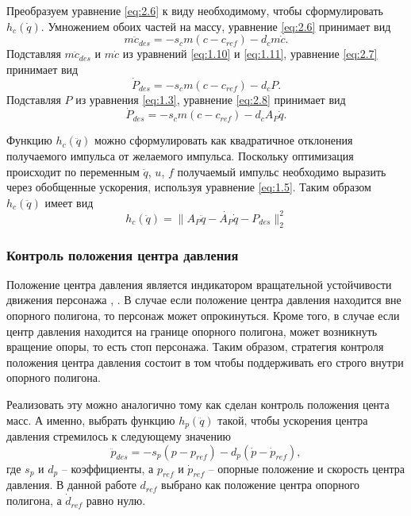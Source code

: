 Преобразуем уравнение \ref{eq:2.6} к виду необходимому, чтобы сформулировать $h_c(\dot{q})$. Умножением обоих частей на массу, уравнение \ref{eq:2.6} принимает вид
\begin{equation*}
  m \ddot{c}_{des} = - s_{c} m (c - c_{ref}) - d_{c} m \dot{c}. \tag{2.7}\label{eq:2.7}
\end{equation*}
Подставляя $m \ddot{c}_{des}$ и $m \dot{c}$ из уравнений \ref{eq:1.10} и \ref{eq:1.11}, уравнение \ref{eq:2.7} принимает вид
\begin{equation*}
  \dot{P}_{des} = - s_{c} m (c - c_{ref}) - d_{c} P. \tag{2.8}\label{eq:2.8}
\end{equation*}
Подставляя $P$ из уравнения \ref{eq:1.3}, уравнение \ref{eq:2.8} принимает вид
\begin{equation*}
  \dot{P}_{des} = - s_{c} m (c - c_{ref}) - d_{c} A_{P} \dot{q}. \tag{2.9}\label{eq:2.9}
\end{equation*}

Функцию $h_c(\ddot{q})$ можно сформулировать как квадратичное отклонения получаемого импульса от желаемого импульса. Поскольку оптимизация происходит по переменным $\ddot{q}$, $u$, $f$ получаемый импульс необходимо выразить через обобщенные ускорения, используя уравнение \ref{eq:1.5}. Таким образом $h_c(\ddot{q})$ имеет вид
\begin{equation*}
  h_{c}(\ddot{q}) = \lVert A_{P}\ddot{q} - \dot{A_{P}} \dot{q} - P_{des} \rVert_{2}^{2} \tag{2.10}\label{eq:2.10}
\end{equation*}

\subsubsection{Контроль положения центра давления}

Положение центра давления является индикатором вращательной устойчивости движения персонажа \cite{MacchiettoZS}, \cite{GoswamiK}. В случае если положение центра давления находится вне опорного полигона, то персонаж может опрокинуться. Кроме того, в случае если центр давления находится на границе опорного полигона, может возникнуть вращение опоры, то есть стоп персонажа. Таким образом, стратегия контроля положения центра давления состоит в том чтобы поддерживать его строго внутри опорного полигона.

Реализовать эту можно аналогично тому как сделан контроль положения цента масс. А именно, выбрать функцию $h_{p}(\ddot{q})$ такой, чтобы ускорения центра давления стремилось к следующему значению
\begin{equation*}
  \ddot{p}_{des} = - s_{p} (p - p_{ref}) - d_{p} (\dot{p} - \dot{p}_{ref}), \tag{2.11}\label{eq:2.11}
\end{equation*}
где $s_{p}$ и $d_{p}$ -- коэффициенты, а $p_{ref}$ и $\dot{p}_{ref}$ -- опорные положение и скорость центра давления. В данной работе $d_{ref}$ выбрано как положение центра опорного полигона, а $\dot{d}_{ref}$ равно нулю.

